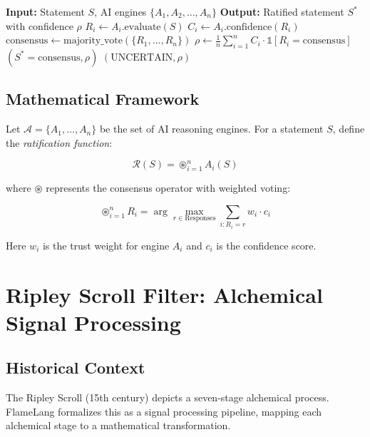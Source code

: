 \documentclass[11pt,a4paper]{article}
\begin{document}
\begin{algorithm}
\caption{Multi-AI Semantic Ratification}
\begin{algorithmic}[1]
\STATE \textbf{Input:} Statement $S$, AI engines $\{A_1, A_2, \ldots, A_n\}$
\STATE \textbf{Output:} Ratified statement $S^*$ with confidence $\rho$
    \STATE $R_i \gets A_i.\text{evaluate}(S)$
    \STATE $C_i \gets A_i.\text{confidence}(R_i)$
\ENDFOR
\STATE $\text{consensus} \gets \text{majority\_vote}(\{R_1, \ldots, R_n\})$
\STATE $\rho \gets \frac{1}{n} \sum_{i=1}^{n} C_i \cdot \mathbb{1}[R_i = \text{consensus}]$
    \RETURN $(S^* = \text{consensus}, \rho)$
\ELSE
    \RETURN $(\text{UNCERTAIN}, \rho)$
\ENDIF
\end{algorithmic}
\end{algorithm}

\subsection{Mathematical Framework}

Let $\mathcal{A} = \{A_1, \ldots, A_n\}$ be the set of AI reasoning engines. For a statement $S$, define the \textit{ratification function}:

\begin{equation}
\mathcal{R}(S) = \circledast_{i=1}^{n} A_i(S)
\end{equation}

where $\circledast$ represents the consensus operator with weighted voting:

\begin{equation}
\circledast_{i=1}^{n} R_i = \arg\max_{r \in \text{Responses}} \sum_{i: R_i = r} w_i \cdot c_i
\end{equation}

Here $w_i$ is the trust weight for engine $A_i$ and $c_i$ is the confidence score.

\section{Ripley Scroll Filter: Alchemical Signal Processing}

\subsection{Historical Context}

The Ripley Scroll (15th century) depicts a seven-stage alchemical process. FlameLang formalizes this as a signal processing pipeline, mapping each alchemical stage to a mathematical transformation.
\end{document}
